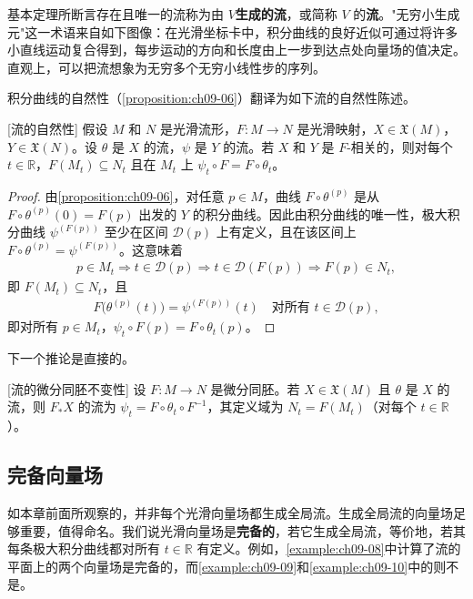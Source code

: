 \documentclass[../../main.tex]{subfiles}
\begin{document}
基本定理所断言存在且唯一的流称为由 $V$\textbf{生成的流}，或简称 $V$ 的\textbf{流}。"无穷小生成元"这一术语来自如下图像：在光滑坐标卡中，积分曲线的良好近似可通过将许多小直线运动复合得到，每步运动的方向和长度由上一步到达点处向量场的值决定。直观上，可以把流想象为无穷多个无穷小线性步的序列。

积分曲线的自然性（\cref{proposition:ch09-06}）翻译为如下流的自然性陈述。

\begin{proposition}\label{proposition:ch09-13}[流的自然性]
假设 $M$ 和 $N$ 是光滑流形，$F\colon M\to N$ 是光滑映射，$X\in\mathfrak{X}(M)$，$Y\in\mathfrak{X}(N)$。设 $\theta$ 是 $X$ 的流，$\psi$ 是 $Y$ 的流。若 $X$ 和 $Y$ 是 $F$-相关的，则对每个 $t\in\mathbb{R}$，$F(M_t)\subseteq N_t$ 且在 $M_t$ 上 $\psi_t\circ F=F\circ\theta_t$。
\end{proposition}

\begin{proof}
由\cref{proposition:ch09-06}，对任意 $p\in M$，曲线 $F\circ\theta^{(p)}$ 是从 $F\circ\theta^{(p)}(0)=F(p)$ 出发的 $Y$ 的积分曲线。因此由积分曲线的唯一性，极大积分曲线 $\psi^{(F(p))}$ 至少在区间 $\mathscr{D}(p)$ 上有定义，且在该区间上 $F\circ\theta^{(p)}=\psi^{(F(p))}$。这意味着
\begin{align*}
p\in M_t\Rightarrow t\in\mathscr{D}(p)\Rightarrow t\in\mathscr{D}(F(p))\Rightarrow F(p)\in N_t,
\end{align*}
即 $F(M_t)\subseteq N_t$，且
\begin{align*}
F\bigl(\theta^{(p)}(t)\bigr)=\psi^{(F(p))}(t)\quad\text{对所有 }t\in\mathscr{D}(p),
\end{align*}
即对所有 $p\in M_t$，$\psi_t\circ F(p)=F\circ\theta_t(p)$。
\end{proof}

下一个推论是直接的。

\begin{corollary}\label{corollary:ch09-14}[流的微分同胚不变性]
设 $F\colon M\to N$ 是微分同胚。若 $X\in\mathfrak{X}(M)$ 且 $\theta$ 是 $X$ 的流，则 $F_*X$ 的流为 $\psi_t=F\circ\theta_t\circ F^{-1}$，其定义域为 $N_t=F(M_t)$（对每个 $t\in\mathbb{R}$）。
\end{corollary}

\subsection*{完备向量场}

如本章前面所观察的，并非每个光滑向量场都生成全局流。生成全局流的向量场足够重要，值得命名。我们说光滑向量场是\textbf{完备的}，若它生成全局流，等价地，若其每条极大积分曲线都对所有 $t\in\mathbb{R}$ 有定义。例如，\cref{example:ch09-08}中计算了流的平面上的两个向量场是完备的，而\cref{example:ch09-09}和\cref{example:ch09-10}中的则不是。
\end{document}

